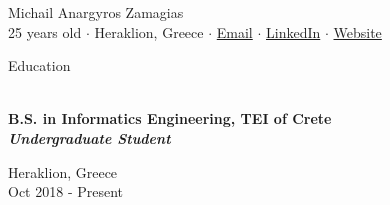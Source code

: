 \documentclass[a4paper, 11pt]{article}
\newcommand{\lineunder} {
    \vspace*{-8pt} \\
    \hspace*{-18pt} \hrulefill \\
}
\newcommand{\header} [1] {
    \vspace*{6mm}
    {\hspace*{-18pt}\vspace*{6pt} #1}
    \vspace*{-6pt} \lineunder
}
\newcommand{\education}[4]{ %
    \vspace*{6pt} %
    \begin{minipage}[t]{0.75\textwidth}
        {\Large \textbf{#1}} \\ %
        \vspace*{2pt}
        {\textbf{\textit{#2}}} \\ %
    \end{minipage} \hfill
    \begin{minipage}[t]{0.2\textwidth}
        \raggedleft
        \sloppy
        #3 \\
        #4
    \end{minipage}
    \vspace*{6pt} %
}
\newcommand{\socialmediabutton}[2]{%
    \href{#1}{#2}
}
\begin{document}
\vspace*{-30pt}

\begin{center}
    {\Huge {Michail Anargyros Zamagias}} \\\vspace*{2mm}
    25 years old $\cdot$
    Heraklion, Greece $\cdot$
    \socialmediabutton{mailto:contact@mikezamayias.com}{Email}$\cdot$
    \socialmediabutton{https://linkedin.com/in/mikezamayias}{LinkedIn}$\cdot$
    \socialmediabutton{https://mikezamayias.com}{Website}
\end{center}

\header{Education}
\education
{B.S. in Informatics Engineering, TEI of Crete}
{Undergraduate Student}
{Heraklion, Greece}
{Oct 2018 - Present}
\end{document}

